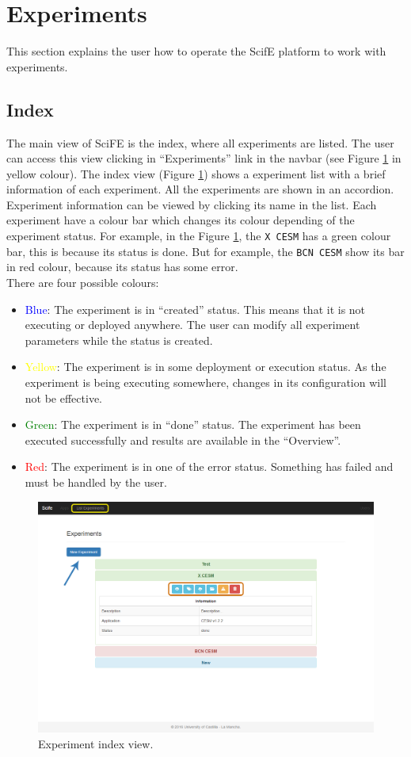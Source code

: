 \documentclass[11pt]{article}
\begin{document}
\section{Experiments}
This section explains the user how to operate the ScifE platform to work with experiments.

\subsection{Index}
The main view of SciFE is the index, where all experiments are listed. The user can access this view clicking in ``Experiments'' link in the navbar (see Figure \ref{fig:index} in yellow colour). The index view (Figure \ref{fig:index}) shows a experiment list with a brief information of each experiment. All the experiments are shown in an accordion. Experiment information can be viewed by clicking its name in the list. Each experiment have a colour bar which changes its colour depending of the experiment status. For example, in the Figure \ref{fig:index}, the \texttt{X CESM} has a green colour bar, this is because its status is done. But for example, the \texttt{BCN CESM} show its bar in red colour, because its status has some error.\\
There are four possible colours:
\begin{itemize}
\item
\textcolor{blue}{Blue}: The experiment is in ``created'' status. This means that it is not executing or deployed anywhere. The user can modify all experiment parameters while the status is created.
\item
\textcolor{yellow}{Yellow}: The experiment is in some deployment or execution status. As the experiment is being executing somewhere, changes in its configuration will not be effective.
\item
\textcolor{green}{Green}: The experiment is in ``done'' status. The experiment has been executed successfully and results are available in the ``Overview''.
\item
\textcolor{red}{Red}: The experiment is in one of the error status. Something has failed and must be handled by the user.
\end{itemize}
\begin{figure}[htp]
	\centering
	\includegraphics[width=\linewidth]{index}
	\caption{Experiment index view.}
	\label{fig:index}
\end{figure}
\end{document}
